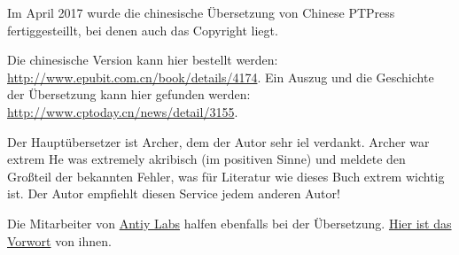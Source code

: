 Im April 2017 wurde die chinesische Übersetzung von Chinese PTPress fertiggesteillt, bei denen
auch das Copyright liegt.

Die chinesische Version kann hier bestellt werden: \url{http://www.epubit.com.cn/book/details/4174}.
Ein Auszug und die Geschichte der Übersetzung kann hier gefunden werden: \url{http://www.cptoday.cn/news/detail/3155}.

Der Hauptübersetzer ist Archer, dem der Autor sehr iel verdankt.
Archer war extrem He was extremely akribisch (im positiven Sinne) und meldete
den Großteil der bekannten Fehler, was für Literatur wie dieses Buch extrem wichtig ist.
Der Autor empfiehlt diesen Service jedem anderen Autor!

Die Mitarbeiter von \href{http://www.antiy.net/}{Antiy Labs} halfen ebenfalls bei der Übersetzung.
\href{http://www.epubit.com.cn/book/onlinechapter/51413}{Hier ist das Vorwort} von ihnen.
